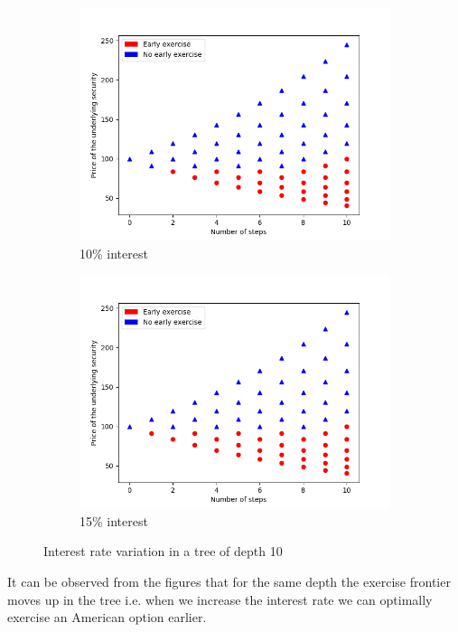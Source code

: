 \documentclass[12pt]{report}
\begin{document}
\begin{small}
\begin{figure}[H]
	
	\begin{subfigure}{.5\textwidth}
		\centering
		\includegraphics[width=.8\linewidth]{plots/n_10_r_01.png}  
		\caption{10\% interest}
		\label{fig1:sub-third}
	\end{subfigure}
	\begin{subfigure}{.5\textwidth}
		\centering
		\includegraphics[width=.8\linewidth]{plots/n_10_r_015.png}  
		\caption{15\% interest}
		\label{fig1:sub-fourth}
	\end{subfigure}
	\caption{Interest rate variation in a tree of depth 10}
	\label{fig:fig1}
\end{figure}
\end{small}

It can be observed from the figures that for the same depth the exercise frontier moves up in the tree i.e. when we increase the interest rate we can optimally exercise an American option earlier.
\end{document}
